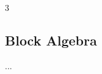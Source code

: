 \documentclass[10pt,landscape]{article}
\begin{document}
\begin{multicols*}{3}
    \subsection{Block Algebra}

    ...

\end{multicols*} 
\end{document}
